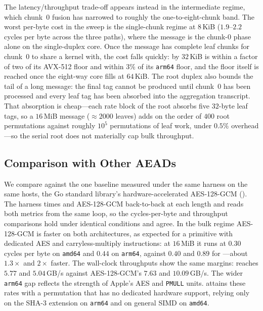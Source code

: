 The latency/throughput trade-off appears instead in the intermediate regime,
which chunk~$0$ fusion has narrowed to roughly the one-to-eight-chunk band. The
worst per-byte cost in the sweep is the single-chunk regime at $8$\,KiB
($1.9$--$2.2$ cycles per byte across the three paths), where the message is the
chunk-$0$ phase alone on the single-duplex core. Once the message has complete
leaf chunks for chunk~$0$ to share a kernel with, the cost falls quickly: by
$32$\,KiB \TW{} is within a factor of two of its AVX-512 floor and within $3\%$
of its \texttt{arm64} floor, and the floor itself is reached once the eight-way
core fills at $64$\,KiB. The root duplex also bounds the tail of a long
message: the final tag cannot be produced until chunk~$0$ has been processed and
every leaf tag has been absorbed into the aggregation transcript. That absorption
is cheap---each rate block of the root absorbs five $32$-byte leaf tags, so a
$16$\,MiB message ($\approx 2000$ leaves) adds on the order of $400$ root
permutations against roughly $10^5$ permutations of leaf work, under $0.5\%$
overhead---so the serial root does not materially cap bulk throughput.

\subsection{Comparison with Other AEADs}
\label{sec:compare-perf}

We compare against the one baseline measured under the same harness on the same
hosts, the Go standard library's hardware-accelerated AES-128-GCM
(). The harness times \TW{} and AES-128-GCM
back-to-back at each length and reads both metrics from the same loop, so the
cycles-per-byte and throughput comparisons hold under identical conditions and
agree. In the bulk regime AES-128-GCM is faster on both architectures, as
expected for a primitive with dedicated AES and carryless-multiply instructions:
at $16$\,MiB it runs at $0.30$ cycles per byte on \texttt{amd64} and $0.44$ on
\texttt{arm64}, against $0.40$ and $0.89$ for \TW{}---about $1.3\times$ and
$2\times$ faster. The wall-clock throughputs show the same margins: \TW{} reaches
$5.77$ and $5.04$\,GB/s against AES-128-GCM's $7.63$ and $10.09$\,GB/s. The wider
\texttt{arm64} gap reflects the strength of Apple's AES and \texttt{PMULL} units.
\TW{} attains these rates with a permutation that has no dedicated hardware
support, relying only on the SHA-3 extension on \texttt{arm64} and on general SIMD
on \texttt{amd64}.

